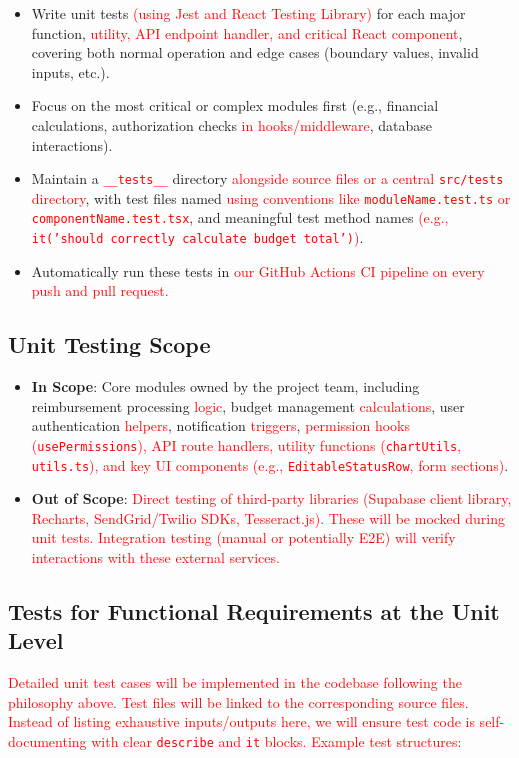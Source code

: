 \documentclass[12pt, titlepage]{article}
\begin{document}
\begin{itemize}
    \item Write unit tests \textcolor{red}{(using Jest and React Testing Library)} for each major function, \textcolor{red}{utility, API endpoint handler, and critical React component}, covering both normal operation and edge cases (boundary values, invalid inputs, etc.).
    \item Focus on the most critical or complex modules first (e.g., financial calculations, authorization checks \textcolor{red}{in hooks/middleware}, database interactions).
    \item Maintain a \textcolor{red}{\texttt{\_\_tests\_\_}} directory \textcolor{red}{alongside source files or a central \texttt{src/tests} directory}, with test files named \textcolor{red}{using conventions like \texttt{moduleName.test.ts} or \texttt{componentName.test.tsx}}, and meaningful test method names \textcolor{red}{(e.g., \texttt{it('should correctly calculate budget total')})}.
    \item Automatically run these tests in \textcolor{red}{our GitHub Actions CI pipeline on every push and pull request.}
\end{itemize}

\subsection{Unit Testing Scope}

\begin{itemize}
    \item \textbf{In Scope}: Core modules owned by the project team, including reimbursement processing \textcolor{red}{logic}, budget management \textcolor{red}{calculations}, user authentication \textcolor{red}{helpers}, notification \textcolor{red}{triggers}, \textcolor{red}{permission hooks (\texttt{usePermissions}), API route handlers, utility functions (\texttt{chartUtils}, \texttt{utils.ts}), and key UI components (e.g., \texttt{EditableStatusRow}, form sections)}.
    \item \textbf{Out of Scope}: \textcolor{red}{Direct testing of third-party libraries (Supabase client library, Recharts, SendGrid/Twilio SDKs, Tesseract.js). These will be mocked during unit tests. Integration testing (manual or potentially E2E) will verify interactions with these external services.}
\end{itemize}

\subsection{Tests for Functional Requirements at the Unit Level}
\textcolor{red}{Detailed unit test cases will be implemented in the codebase following the philosophy above. Test files will be linked to the corresponding source files. Instead of listing exhaustive inputs/outputs here, we will ensure test code is self-documenting with clear \texttt{describe} and \texttt{it} blocks. Example test structures:}
\end{document}
